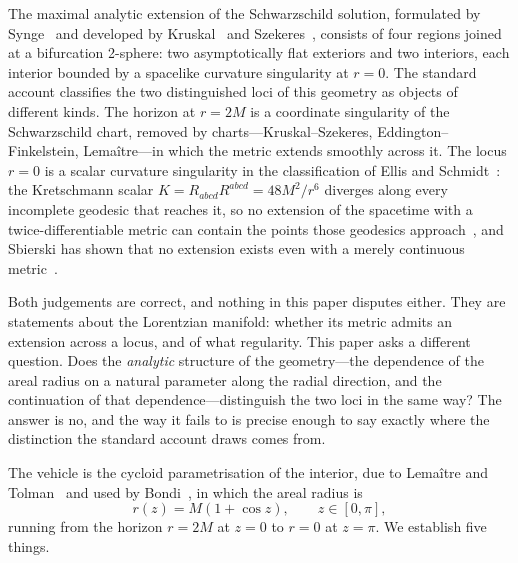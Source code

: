 \documentclass{iopjournal}
\theoremstyle{plain}
\theoremstyle{remark}
\begin{document}
The maximal analytic extension of the Schwarzschild solution, formulated by Synge~\cite{synge1950} and developed by Kruskal~\cite{kruskal1960} and Szekeres~\cite{szekeres1960}, consists of four regions joined at a bifurcation 2-sphere: two asymptotically flat exteriors and two interiors, each interior bounded by a spacelike curvature singularity at $r=0$. The standard account classifies the two distinguished loci of this geometry as objects of different kinds. The horizon at $r=2M$ is a coordinate singularity of the Schwarzschild chart, removed by charts---Kruskal--Szekeres, Eddington--Finkelstein, Lemaître---in which the metric extends smoothly across it. The locus $r=0$ is a scalar curvature singularity in the classification of Ellis and Schmidt~\cite{EllisSchmidt1977}: the Kretschmann scalar $K=R_{abcd}R^{abcd}=48M^{2}/r^{6}$ diverges along every incomplete geodesic that reaches it, so no extension of the spacetime with a twice-differentiable metric can contain the points those geodesics approach~\cite{Hawking1973,Wald1984}, and Sbierski has shown that no extension exists even with a merely continuous metric~\cite{sbierski2018}.

Both judgements are correct, and nothing in this paper disputes either. They are statements about the Lorentzian manifold: whether its metric admits an extension across a locus, and of what regularity. This paper asks a different question. Does the \emph{analytic} structure of the geometry---the dependence of the areal radius on a natural parameter along the radial direction, and the continuation of that dependence---distinguish the two loci in the same way? The answer is no, and the way it fails to is precise enough to say exactly where the distinction the standard account draws comes from.

The vehicle is the cycloid parametrisation of the interior, due to Lemaître and Tolman~\cite{lemaitre1933,Tolman1934} and used by Bondi~\cite{Bondi1947}, in which the areal radius is
\begin{equation}\label{eq:cycloid}
r(z)=M(1+\cos z),\qquad z\in[0,\pi],
\end{equation}
running from the horizon $r=2M$ at $z=0$ to $r=0$ at $z=\pi$. We establish five things.
\end{document}
